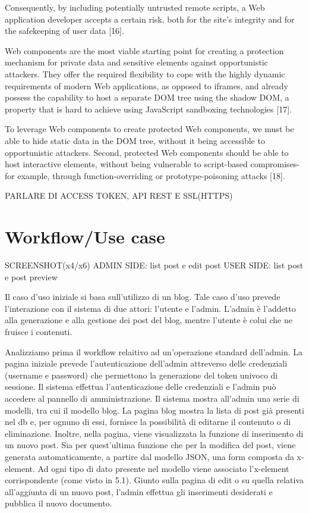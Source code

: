 \documentclass{sig-alternate}
\begin{document}
Consequently, by including potentially untrusted remote scripts, a Web application developer accepts a certain risk, both for the site's integrity and for the safekeeping of user data [16].

Web components are the most viable starting point for creating a protection mechanism for private data and sensitive elements against opportunistic attackers. They offer the required flexibility to cope with the highly dynamic requirements of modern Web applications, as opposed to iframes, and already possess the capability to host a separate DOM tree using the shadow DOM, a property that is hard to achieve using JavaScript sandboxing technologies [17].

To leverage Web components to create protected Web components, we must be able to hide static data in the DOM tree, without it being accessible to opportunistic attackers. Second, protected Web components should be able to host interactive elements, without being vulnerable to script-based compromises-for example, through function-overriding or prototype-poisoning attacks [18].

PARLARE DI ACCESS TOKEN, API REST E SSL(HTTPS)

\section{Workflow/Use case}
SCREENSHOT(x4/x6)
	ADMIN SIDE: list post e edit post
	USER SIDE: list post e post preview

Il caso d'uso iniziale si basa sull'utilizzo di un blog. Tale caso d'uso prevede l'interazione con il sistema di due attori: l'utente e l'admin.
L'admin è l'addetto alla generazione e alla gestione dei post del blog, mentre l'utente è colui che ne fruisce i contenuti.

Analizziamo prima il workflow relaitivo ad un'operazione standard dell'admin.
La pagina iniziale prevede l'autenticazione dell'admin attreverso delle credenziali (username e password) che permettono la generazione del token univoco di sessione. Il sistema effettua l'autenticazione delle credenziali e l'admin può accedere al pannello di amministrazione. Il sistema mostra all'admin una serie di modelli, tra cui il modello blog. La pagina blog mostra la lista di post già presenti nel db e, per ognuno di essi, fornisce la possibilità di editarne il contenuto o di eliminazione.
Inoltre, nella pagina, viene visualizzata la funzione di inserimento di un nuovo post.
Sia per quest'ultima funzione che per la modifica del post, viene generata automaticamente, a partire dal modello JSON, una form composta da x-element. Ad ogni tipo di dato presente nel modello viene associato l'x-element corrispondente (come visto in 5.1).
Giunto sulla pagina di edit o su quella relativa all'aggiunta di un nuovo post, l'admin effettua gli inserimenti desiderati e pubblica il nuovo documento.
\end{document}
